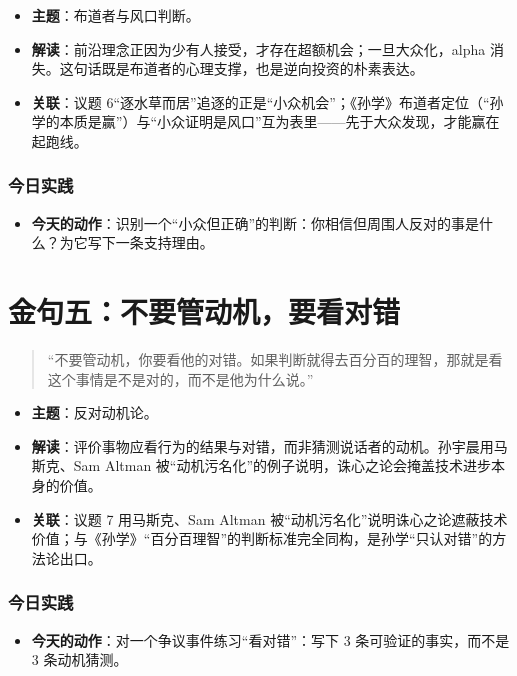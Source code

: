 \begin{itemize}
\tightlist
\item
  \textbf{主题}：布道者与风口判断。
\item
  \textbf{解读}：前沿理念正因为少有人接受，才存在超额机会；一旦大众化，alpha
  消失。这句话既是布道者的心理支撑，也是逆向投资的朴素表达。
\item
  \textbf{关联}：议题
  6``逐水草而居''追逐的正是``小众机会''；《孙学》布道者定位（``孙学的本质是赢''）与``小众证明是风口''互为表里------先于大众发现，才能赢在起跑线。
\end{itemize}

\subsubsection{今日实践}

\begin{itemize}
\tightlist
\item
  \textbf{今天的动作}：识别一个``小众但正确''的判断：你相信但周围人反对的事是什么？为它写下一条支持理由。
\end{itemize}

\section{金句五：不要管动机，要看对错}

\begin{quote}
``不要管动机，你要看他的对错。如果判断就得去百分百的理智，那就是看这个事情是不是对的，而不是他为什么说。''
\end{quote}

\begin{itemize}
\tightlist
\item
  \textbf{主题}：反对动机论。
\item
  \textbf{解读}：评价事物应看行为的结果与对错，而非猜测说话者的动机。孙宇晨用马斯克、Sam
  Altman 被``动机污名化''的例子说明，诛心之论会掩盖技术进步本身的价值。
\item
  \textbf{关联}：议题 7 用马斯克、Sam Altman
  被``动机污名化''说明诛心之论遮蔽技术价值；与《孙学》``百分百理智''的判断标准完全同构，是孙学``只认对错''的方法论出口。
\end{itemize}

\subsubsection{今日实践}

\begin{itemize}
\tightlist
\item
  \textbf{今天的动作}：对一个争议事件练习``看对错''：写下 3
  条可验证的事实，而不是 3 条动机猜测。
\end{itemize}

